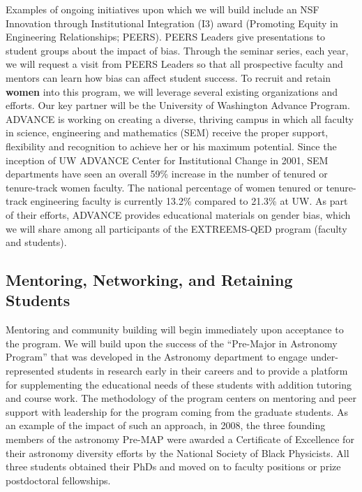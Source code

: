 Examples of ongoing initiatives upon which we will build include an
NSF Innovation through Institutional Integration (I3) award (Promoting
Equity in Engineering Relationships; PEERS). PEERS Leaders give
presentations to student groups about the impact of bias. Through the
seminar series, each year, we will request a visit from PEERS Leaders
so that all prospective faculty and mentors can learn how bias can
affect student success. To recruit and retain {\bf women} into this program, we will leverage
several existing organizations and efforts.  Our key partner will be
the University of Washington Advance Program.  ADVANCE is
working on creating a diverse, thriving campus in which all faculty in
science, engineering and mathematics (SEM) receive the proper support,
flexibility and recognition to achieve her or his maximum
potential. Since the inception of UW ADVANCE Center for Institutional
Change in 2001, SEM departments have seen an overall 59\% increase in
the number of tenured or tenure-track women faculty. The national
percentage of women tenured or tenure-track engineering faculty is
currently 13.2\% compared to 21.3\% at UW. As part of their efforts,
ADVANCE provides educational materials on gender bias, which we will
share among all participants of the EXTREEMS-QED program (faculty and
students). 

\subsection{Mentoring, Networking, and Retaining Students}
\label{sec:MNRetaining}
\vspace{-0.8em}
Mentoring and community building will begin immediately upon
acceptance to the program. We will build upon the success of the
``Pre-Major in Astronomy Program'' \cite{garner2010diversity} that was
developed in the Astronomy department to engage under-represented
students in research early in their careers and to provide a platform
for supplementing the educational needs of these students with
addition tutoring and course work. The methodology of the program
centers on mentoring and peer support with leadership for the program
coming from the graduate students.  As an example of the impact of
such an approach, in 2008, the three founding members of the astronomy
Pre-MAP were awarded a Certificate of Excellence for their astronomy
diversity efforts by the National Society of Black Physicists. All
three students obtained their PhDs and moved on to faculty positions
or prize postdoctoral fellowships.

